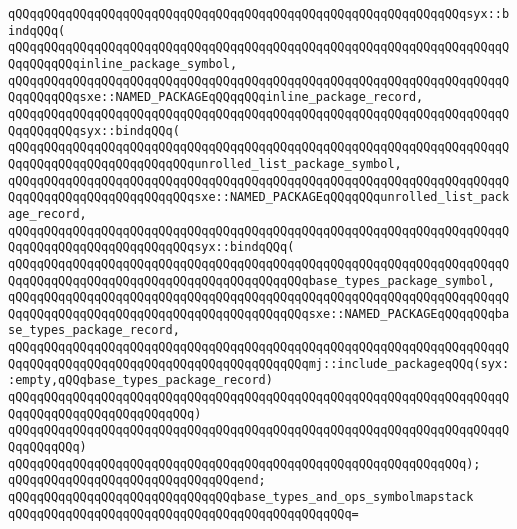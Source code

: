 \verb|qQQqqQQqqQQqqQQqqQQqqQQqqQQqqQQqqQQqqQQqqQQqqQQqqQQqqQQqqQQqqQQqsyx::bindqQQq(|\newline
\verb|qQQqqQQqqQQqqQQqqQQqqQQqqQQqqQQqqQQqqQQqqQQqqQQqqQQqqQQqqQQqqQQqqQQqqQQqqQQqqQQqinline_package_symbol,|\newline
\verb|qQQqqQQqqQQqqQQqqQQqqQQqqQQqqQQqqQQqqQQqqQQqqQQqqQQqqQQqqQQqqQQqqQQqqQQqqQQqqQQqsxe::NAMED_PACKAGEqQQqqQQqinline_package_record,|\newline
\verb|qQQqqQQqqQQqqQQqqQQqqQQqqQQqqQQqqQQqqQQqqQQqqQQqqQQqqQQqqQQqqQQqqQQqqQQqqQQqqQQqsyx::bindqQQq(|\newline
\verb|qQQqqQQqqQQqqQQqqQQqqQQqqQQqqQQqqQQqqQQqqQQqqQQqqQQqqQQqqQQqqQQqqQQqqQQqqQQqqQQqqQQqqQQqqQQqqQQqunrolled_list_package_symbol,|\newline
\verb|qQQqqQQqqQQqqQQqqQQqqQQqqQQqqQQqqQQqqQQqqQQqqQQqqQQqqQQqqQQqqQQqqQQqqQQqqQQqqQQqqQQqqQQqqQQqqQQqsxe::NAMED_PACKAGEqQQqqQQqunrolled_list_package_record,|\newline
\verb|qQQqqQQqqQQqqQQqqQQqqQQqqQQqqQQqqQQqqQQqqQQqqQQqqQQqqQQqqQQqqQQqqQQqqQQqqQQqqQQqqQQqqQQqqQQqqQQqsyx::bindqQQq(|\newline
\verb|qQQqqQQqqQQqqQQqqQQqqQQqqQQqqQQqqQQqqQQqqQQqqQQqqQQqqQQqqQQqqQQqqQQqqQQqqQQqqQQqqQQqqQQqqQQqqQQqqQQqqQQqqQQqqQQqbase_types_package_symbol,|\newline
\verb|qQQqqQQqqQQqqQQqqQQqqQQqqQQqqQQqqQQqqQQqqQQqqQQqqQQqqQQqqQQqqQQqqQQqqQQqqQQqqQQqqQQqqQQqqQQqqQQqqQQqqQQqqQQqqQQqsxe::NAMED_PACKAGEqQQqqQQqbase_types_package_record,|\newline
\verb|qQQqqQQqqQQqqQQqqQQqqQQqqQQqqQQqqQQqqQQqqQQqqQQqqQQqqQQqqQQqqQQqqQQqqQQqqQQqqQQqqQQqqQQqqQQqqQQqqQQqqQQqqQQqqQQqmj::include_packageqQQq(syx::empty,qQQqbase_types_package_record)|\newline
\verb|qQQqqQQqqQQqqQQqqQQqqQQqqQQqqQQqqQQqqQQqqQQqqQQqqQQqqQQqqQQqqQQqqQQqqQQqqQQqqQQqqQQqqQQqqQQqqQQq)|\newline
\verb|qQQqqQQqqQQqqQQqqQQqqQQqqQQqqQQqqQQqqQQqqQQqqQQqqQQqqQQqqQQqqQQqqQQqqQQqqQQqqQQq)|\newline
\verb|qQQqqQQqqQQqqQQqqQQqqQQqqQQqqQQqqQQqqQQqqQQqqQQqqQQqqQQqqQQqqQQq);|\newline
\verb|qQQqqQQqqQQqqQQqqQQqqQQqqQQqqQQqend;|\newline
\newline
\verb|qQQqqQQqqQQqqQQqqQQqqQQqqQQqqQQqbase_types_and_ops_symbolmapstack|\newline
\verb|qQQqqQQqqQQqqQQqqQQqqQQqqQQqqQQqqQQqqQQqqQQqqQQq=|\newline

